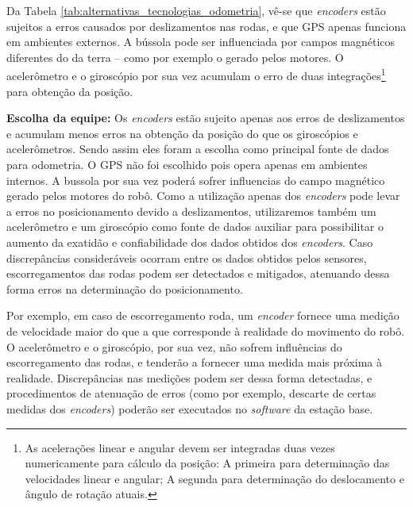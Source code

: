 Da Tabela \ref{tab:alternativas_tecnologias_odometria}, vê-se que \textit{encoders} estão sujeitos a erros causados por deslizamentos nas rodas, e que GPS apenas funciona em ambientes externos. A bússola pode ser influenciada por campos magnéticos diferentes do da terra -- como por exemplo o gerado pelos motores. O acelerômetro e o giroscópio por sua vez acumulam o erro de duas integrações\footnote{As acelerações linear e angular devem ser integradas duas vezes numericamente para cálculo da posição: A primeira para determinação das velocidades linear e angular; A segunda para determinação do deslocamento e ângulo de rotação atuais.} para obtenção da posição.

\textbf{Escolha da equipe:} Os \textit{encoders} estão sujeito apenas aos erros de deslizamentos e acumulam menos erros na obtenção da posição do que os giroscópios e acelerômetros. Sendo assim eles foram a escolha como principal fonte de dados para odometria. O GPS não foi escolhido pois opera apenas em ambientes internos. A bussola por sua vez poderá sofrer influencias do campo magnético gerado pelos motores do robô. Como a utilização apenas dos \textit{encoders} pode levar a erros no posicionamento devido a deslizamentos, utilizaremos também um acelerômetro e um giroscópio como fonte de dados auxiliar para possibilitar o aumento da exatidão e confiabilidade dos dados obtidos dos \textit{encoders}. Caso discrepâncias consideráveis ocorram entre os dados obtidos pelos sensores, escorregamentos das rodas podem ser detectados e mitigados, atenuando dessa forma erros na determinação do posicionamento.

Por exemplo, em caso de escorregamento roda, um \textit{encoder} fornece uma medição de velocidade maior do que a que corresponde à realidade do movimento do robô. O acelerômetro e o giroscópio, por sua vez, não sofrem influências do escorregamento das rodas, e tenderão a fornecer uma medida mais próxima à realidade. Discrepâncias nas medições podem ser dessa forma detectadas, e procedimentos de atenuação de erros (como por exemplo, descarte de certas medidas dos \textit{encoders}) poderão ser executados no \textit{software} da estação base.


